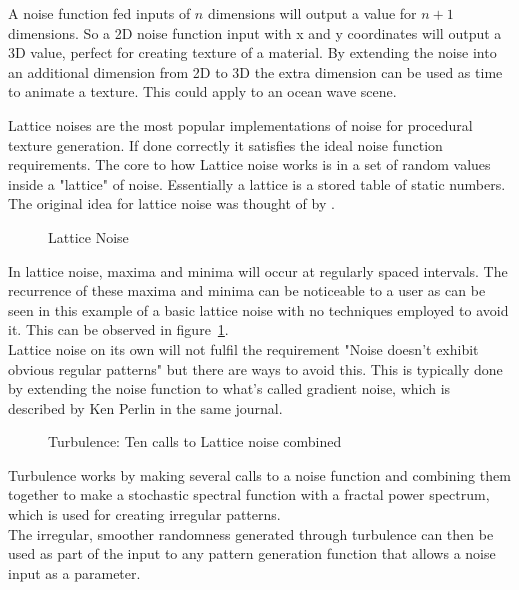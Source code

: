 \documentclass{report}
\begin{document}
A noise function fed inputs of $n$ dimensions will output a value for $n+1$ dimensions. So a 2D noise function input with x and y coordinates will output a 3D value, perfect for creating texture of a material.
By extending the noise into an additional dimension from 2D to 3D the extra dimension can be used as time to animate a texture. This could apply to an ocean wave scene. \citep{perlin2002improving}

Lattice noises are the most popular implementations of noise for procedural texture generation. If done correctly it satisfies the ideal noise function requirements. The core to how Lattice noise works is in a set of random values inside a "lattice" of noise. Essentially a lattice is a stored table of static numbers.\\
The original idea for lattice noise was thought of by \citep{perlin1985image}.

\vspace{0.8cm}

\begin{figure}
\centerline{}
\caption[Lattice Noise]{}\label{fgr:ln}
\centerline{Lattice Noise}
\end{figure}

In lattice noise, maxima and minima will occur at regularly spaced intervals. The recurrence of these maxima and minima can be noticeable to a user as can be seen
in this example of a basic lattice noise with no techniques employed to avoid it. This can be observed in figure~\ref{fgr:ln}.\\
Lattice noise on its own will not fulfil the requirement "Noise doesn't exhibit obvious regular patterns" but there are ways to avoid this. This is typically done by extending the noise function to what's called gradient noise, which is described by Ken Perlin in the same journal.

\vspace{0.8cm}

\begin{figure}
\centerline{}
\caption[Lattice Noise Turbulence]{}\label{fgr:lnt}
\centerline{Turbulence: Ten calls to Lattice noise combined}
\end{figure}

Turbulence works by making several calls to a noise function and combining them together to make a stochastic spectral function with a fractal power spectrum, which is used for creating irregular patterns.\\
The irregular, smoother randomness generated through turbulence can then be used as part of the input to any pattern generation function that allows a noise input as a parameter.
\end{document}
